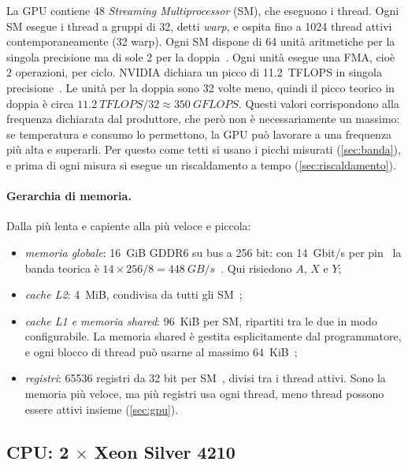 \documentclass[11pt,a4paper]{article}
\begin{document}
La GPU contiene 48 \emph{Streaming Multiprocessor} (SM), che eseguono i thread. Ogni SM esegue i thread
a gruppi di 32, detti \emph{warp}, e ospita fino a 1024 thread attivi
contemporaneamente (32 warp). Ogni SM dispone di 64 unità aritmetiche per la singola precisione ma di sole
2 per la doppia~\cite{nvidia-turing}. Ogni unità esegue una FMA, cioè 2 operazioni, per ciclo. NVIDIA dichiara un
picco di \SI{11.2}{TFLOPS} in singola precisione~\cite{nvidia-rtx5000}. Le
unità per la doppia sono 32 volte meno, quindi il picco teorico in doppia è
circa $\SI{11.2}{TFLOPS} / 32 \approx \SI{350}{GFLOPS}$. Questi valori
corrispondono alla frequenza dichiarata dal produttore, che però non è
necessariamente un massimo: se temperatura e consumo lo permettono, la GPU può
lavorare a una frequenza più alta e superarli. Per questo come tetti si usano i
picchi misurati (\cref{sec:banda}), e prima di ogni misura si esegue un
riscaldamento a tempo (\cref{sec:riscaldamento}).

\paragraph{Gerarchia di memoria.} Dalla più lenta e capiente alla più veloce e
piccola:
\begin{itemize}
  \item \emph{memoria globale}: \SI{16}{GiB} GDDR6 su bus a 256 bit: con \SI{14}{Gbit/s} per pin~\cite{nvidia-turing-wp} la banda teorica è
        $14 \times 256 / 8 = \SI{448}{GB/s}$~\cite{nvidia-rtx5000}. Qui risiedono $A$, $X$ e $Y$;
  \item \emph{cache L2}: \SI{4}{MiB}, condivisa da tutti gli SM~\cite{nvidia-turing-wp};
  \item \emph{cache L1 e memoria shared}: \SI{96}{KiB} per SM, ripartiti tra le
        due in modo configurabile. La memoria shared è gestita esplicitamente
        dal programmatore, e ogni blocco di thread può usarne al massimo
        \SI{64}{KiB}~\cite{nvidia-turing};
  \item \emph{registri}: \num{65536} registri da 32 bit per SM~\cite{nvidia-turing}, divisi tra i
        thread attivi. Sono la memoria più veloce, ma più registri usa ogni
        thread, meno thread possono essere attivi insieme
        (\cref{sec:gpu}).
\end{itemize}

\subsection{CPU: 2 $\times$ Xeon Silver 4210}\label{sec:cpu-hw}
\end{document}
